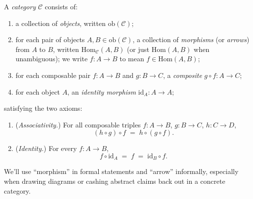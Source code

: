 \begin{definition}[Category]
A \textit{category} $\mathcal{C}$ consists of:
\begin{enumerate}[label=\roman*)]
    \item a collection of \textit{objects}, written $\mathrm{ob}(\mathcal{C})$;
    \item for each pair of objects $A, B \in \mathrm{ob}(\mathcal{C})$, a collection
    of \textit{morphisms} (or \textit{arrows}) from $A$ to $B$, written
    $\mathrm{Hom}_\mathcal{C}(A, B)$ (or just $\mathrm{Hom}(A, B)$ when unambiguous);
    we write $f : A \to B$ to mean $f \in \mathrm{Hom}(A, B)$;
    \item for each composable pair $f : A \to B$ and $g : B \to C$, a
    \textit{composite} $g \circ f : A \to C$;
    \item for each object $A$, an \textit{identity morphism}
    $\mathrm{id}_A : A \to A$;
\end{enumerate}
satisfying the two axioms:
\begin{enumerate}[label=(\arabic*)]
    \item (\textit{Associativity.}) For all composable triples
    $f : A \to B$, $g : B \to C$, $h : C \to D$,
    \[ (h \circ g) \circ f \; = \; h \circ (g \circ f). \]
    \item (\textit{Identity.}) For every $f : A \to B$,
    \[ f \circ \mathrm{id}_A \; = \; f \; = \; \mathrm{id}_B \circ f. \]
\end{enumerate}
\end{definition}

\noindent We'll use ``morphism'' in formal statements and ``arrow'' informally,
especially when drawing diagrams or cashing abstract claims back out in a concrete
category.

